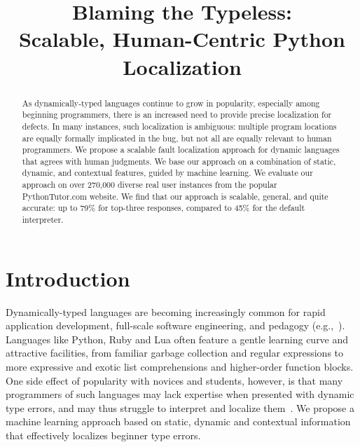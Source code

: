 \documentclass[conference]{IEEEtran}
\begin{document}
%
\title{Blaming the Typeless: \\ Scalable, Human-Centric Python Localization}

\iffalse

\author{\IEEEauthorblockN{Benjamin Cosman}
\IEEEauthorblockA{\textit{UC San Diego}\\
blcosman@eng.ecsd.edu}
\and
\IEEEauthorblockN{Leon Medvinsky}
\IEEEauthorblockA{\textit{UC San Diego}\\
lmedvinsky@eng.ecsd.edu}
\and
\IEEEauthorblockN{Ranjit Jhala}
\IEEEauthorblockA{\textit{UC San Diego}\\
jhala@cs.ecsd.edu}
\and
\IEEEauthorblockN{Westley Weimer}
\IEEEauthorblockA{\textit{University of Michigan}\\
weimerw@umich.edu}
}

\fi

\author{}

\maketitle

\begin{abstract}
As dynamically-typed languages continue to grow in popularity, especially
among beginning programmers, there is an increased need to provide precise
localization for defects. In many instances, such localization is
ambiguous: multiple program locations are equally formally implicated in
the bug, but not all are equally relevant to human programmers. We propose
a scalable fault localization approach for dynamic languages that agrees
with human judgments. We base our approach on a combination of static,
dynamic, and contextual features, guided by machine learning. We evaluate
our approach on over 270,000 diverse real user instances from the popular
PythonTutor.com website. We find that our approach is scalable, general,
and quite accurate: up to 79\% for top-three responses, compared to 45\%
for the default interpreter.
\end{abstract}

\section{Introduction}

Dynamically-typed languages are becoming increasingly common for rapid
application development, full-scale software engineering, and
pedagogy (e.g.,~\cite{FIXME,FIXME}). Languages like Python, Ruby and Lua
often feature a gentle learning curve and attractive facilities, from
familiar garbage collection and regular expressions to more expressive and
exotic list comprehensions and higher-order function blocks. One side
effect of popularity with novices and students, however, is that many
programmers of such languages may lack expertise when presented with
dynamic type errors, and may thus struggle to interpret and localize
them~\cite{orso-parnin,Zhang2014-lv,Christiansen2014-qc,Pavlinovic2014-mr,Chen2014-gd,Neubauer2003-xv,Stuckey2004-ne}.
We propose a machine learning approach based on static, dynamic and
contextual information that effectively localizes beginner type errors.
\end{document}
